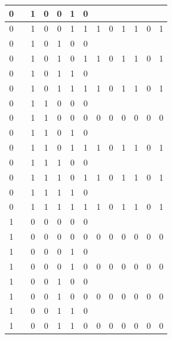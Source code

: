 \begin{table}[!tb]
\begin{tabular}{|c|c|c|c|c|c|c|c|c|c|c|c|c|}
        \rowcolor{yellow!40} 0 &  & 1 & 0 & 0 & 1 & 0 &  &  &  &  &  &  \\ \hline
        \rowcolor{yellow!40} 0 &  & 1 & 0 & 0 & 1 & 1 & 1 & 0 & 1 & 1 & 0 & 1 \\ \hline
        \rowcolor{gray!40} 0 &  & 1 & 0 & 1 & 0 & 0 &  &  &  &  &  &  \\ \hline
        \rowcolor{gray!40} 0 &  & 1 & 0 & 1 & 0 & 1 & 1 & 0 & 1 & 1 & 0 & 1 \\ \hline
        \rowcolor{blue!40} 0 &  & 1 & 0 & 1 & 1 & 0 &  &  &  &  &  &  \\ \hline
        \rowcolor{blue!40} 0 &  & 1 & 0 & 1 & 1 & 1 & 1 & 0 & 1 & 1 & 0 & 1 \\ \hline
        \rowcolor{red!40} 0 &  & 1 & 1 & 0 & 0 & 0 &  &  &  &  &  &  \\ \hline
        \rowcolor{red!40} 0 &  & 1 & 1 & 0 & 0 & 0 & 0 & 0 & 0 & 0 & 0 & 0 \\ \hline
        \rowcolor{green!40} 0 &  & 1 & 1 & 0 & 1 & 0 &  &  &  &  &  &  \\ \hline
        \rowcolor{green!40} 0 &  & 1 & 1 & 0 & 1 & 1 & 1 & 0 & 1 & 1 & 0 & 1 \\ \hline
        \rowcolor{yellow!40} 0 &  & 1 & 1 & 1 & 0 & 0 &  &  &  &  &  &  \\ \hline
        \rowcolor{yellow!40} 0 &  & 1 & 1 & 1 & 0 & 1 & 1 & 0 & 1 & 1 & 0 & 1 \\ \hline
        \rowcolor{gray!40} 0 &  & 1 & 1 & 1 & 1 & 0 &  &  &  &  &  &  \\ \hline
        \rowcolor{gray!40} 0 &  & 1 & 1 & 1 & 1 & 1 & 1 & 0 & 1 & 1 & 0 & 1 \\ \hline
        \rowcolor{blue!40} 1 &  & 0 & 0 & 0 & 0 & 0 &  &  &  &  &  &  \\ \hline
        \rowcolor{blue!40} 1 &  & 0 & 0 & 0 & 0 & 0 & 0 & 0 & 0 & 0 & 0 & 0 \\ \hline
        \rowcolor{red!40} 1 &  & 0 & 0 & 0 & 1 & 0 &  &  &  &  &  &  \\ \hline
        \rowcolor{red!40} 1 &  & 0 & 0 & 0 & 1 & 0 & 0 & 0 & 0 & 0 & 0 & 0 \\ \hline
        \rowcolor{green!40} 1 &  & 0 & 0 & 1 & 0 & 0 &  &  &  &  &  &  \\ \hline
        \rowcolor{green!40} 1 &  & 0 & 0 & 1 & 0 & 0 & 0 & 0 & 0 & 0 & 0 & 0 \\ \hline
        \rowcolor{yellow!40} 1 &  & 0 & 0 & 1 & 1 & 0 &  &  &  &  &  &  \\ \hline
        \rowcolor{yellow!40} 1 &  & 0 & 0 & 1 & 1 & 0 & 0 & 0 & 0 & 0 & 0 & 0 \\ \hline

\end{tabular}
\end{table}
